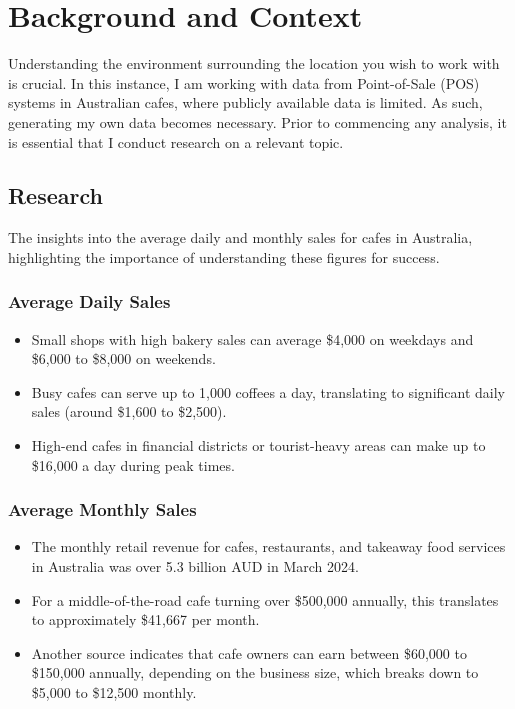 \section{Background and Context}

Understanding the environment surrounding the location you wish to work with is crucial. In this instance, I am working with data from Point-of-Sale (POS) systems in Australian cafes, where publicly available data is limited. As such, generating my own data becomes necessary. Prior to commencing any analysis, it is essential that I conduct research on a relevant topic.

\subsection{Research}

The insights into the average daily and monthly sales for cafes in Australia, highlighting the importance of understanding these figures for success.

\subsubsection{Average Daily Sales}

\begin{itemize}
	\item Small shops with high bakery sales can average \$4,000 on weekdays and \$6,000 to \$8,000 on weekends.
	\item Busy cafes can serve up to 1,000 coffees a day, translating to significant daily sales (around \$1,600 to \$2,500).
	\item High-end cafes in financial districts or tourist-heavy areas can make up to \$16,000 a day during peak times.
\end{itemize}


\subsubsection{Average Monthly Sales}

\begin{itemize}
	\item The monthly retail revenue for cafes, restaurants, and takeaway food services in Australia was over 5.3 billion AUD in March 2024. \cite{khalil2024}
	\item For a middle-of-the-road cafe turning over \$500,000 annually, this translates to approximately \$41,667 per month. \cite{khalil2024}
	\item Another source indicates that cafe owners can earn between \$60,000 to \$150,000 annually, depending on the business size, which breaks down to \$5,000 to \$12,500 monthly. \cite{khalil2024}
\end{itemize}

